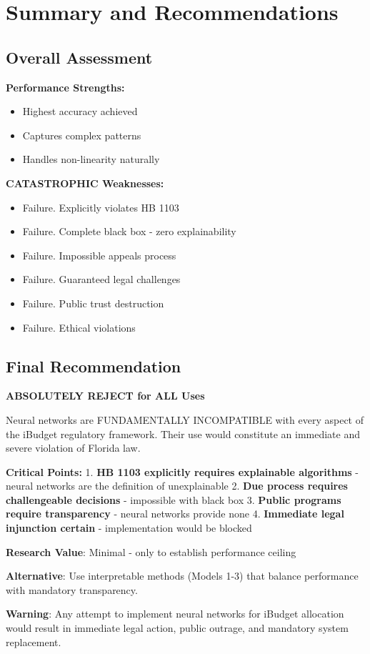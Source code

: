 \section{Summary and Recommendations}

\subsection{Overall Assessment}

\textbf{Performance Strengths:}
\begin{itemize}
    \item Highest accuracy achieved
    \item Captures complex patterns
    \item Handles non-linearity naturally
\end{itemize}

\textbf{CATASTROPHIC Weaknesses:}
\begin{itemize}
    \item Failure.  Explicitly violates HB 1103
    \item Failure.  Complete black box - zero explainability
    \item Failure.  Impossible appeals process
    \item Failure.  Guaranteed legal challenges
    \item Failure.  Public trust destruction
    \item Failure.  Ethical violations
\end{itemize}

\subsection{Final Recommendation}

\textbf{ABSOLUTELY REJECT for ALL Uses}

Neural networks are FUNDAMENTALLY INCOMPATIBLE with every aspect of the iBudget regulatory framework. Their use would constitute an immediate and severe violation of Florida law.

\textbf{Critical Points:}
1. \textbf{HB 1103 explicitly requires explainable algorithms} - neural networks are the definition of unexplainable
2. \textbf{Due process requires challengeable decisions} - impossible with black box
3. \textbf{Public programs require transparency} - neural networks provide none
4. \textbf{Immediate legal injunction certain} - implementation would be blocked

\textbf{Research Value}: Minimal - only to establish performance ceiling

\textbf{Alternative}: Use interpretable methods (Models 1-3) that balance performance with mandatory transparency.

\textbf{Warning}: Any attempt to implement neural networks for iBudget allocation would result in immediate legal action, public outrage, and mandatory system replacement.

